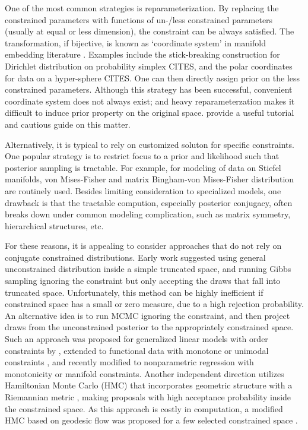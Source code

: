 \documentclass[10pt,fleqn]{article}
\DeclareMathOperator{\1}{\mathbbm{1}}
\begin{document}
One of the most common strategies is reparameterization. By replacing the
constrained parameters with functions of un-/less constrained parameters (usually at equal or less dimension), the constraint can be always
satisfied. The transformation, if bijective,  is known as `coordinate system' in manifold embedding literature \citep{nash1954c1,do2016differential}. Examples
include the stick-breaking construction for Dirichlet distribution on
probability simplex CITES, and the polar coordinates for data on a hyper-sphere
CITES.  One can then directly assign prior on the less constrained parameters.
Although this strategy has been successful, convenient coordinate system does not always exist; and heavy reparameterzation makes it difficult to
induce prior property on the original space. \cite{diaconis2013manifold}
provide a useful tutorial and cautious guide on this matter.

Alternatively, it is typical to rely on customized soluton for specific
constraints. One popular strategy is to restrict focus to a prior and
likelihood such that posterior sampling is tractable. For example, for
modeling of data on Stiefel manifolds, von Mises-Fisher and matrix Bingham-von
Mises-Fisher distribution  \citep{khatri1977mises,hoff2009simulation} are
routinely used. Besides limiting consideration to specialized models, one  drawback is that the tractable compution, especially posterior conjugacy, often breaks down under common modeling complication, such as matrix symmetry, hierarchical structures, etc.

For these reasons, it is appealing to consider approaches that do not rely on conjugate constrained distributions. Early work \citep{gelfand1992bayesian} suggested using general unconstrained distribution inside a simple truncated space, and running Gibbs sampling ignoring the constraint but only accepting the draws that fall into truncated space. Unfortunately, this method can be highly inefficient if constrained space has a small or zero measure, due to a high rejection probability. An alternative idea is to run MCMC ignoring the constraint, and then project draws from the unconstrained posterior to the appropriately constrained space. Such an approach was proposed for generalized linear models with order constraints by \cite{dunson2003bayesian}, extended to functional data with monotone or unimodal constraints \citep{gunn2005transformation}, and
recently modified to nonparametric regression with monotonicity
\citep{lin2014monogp} or manifold \citep{lin2016extrinsic} constraints. Another independent direction utilizes Hamiltonian Monte Carlo (HMC) that incorporates geometric structure with a Riemannian metric \citep{girolami2011riemann}, making proposals with high acceptance probability inside the constrained space. As this approach is costly in computation, a modified HMC based on geodesic flow was proposed for a few selected constrained space \citep{byrne2013geodesic}.
\end{document}
